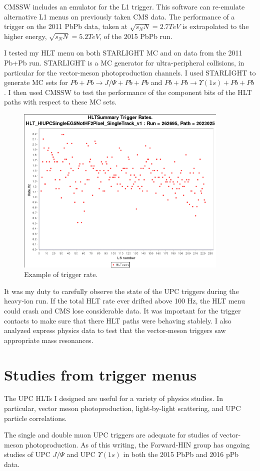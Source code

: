 CMSSW includes an emulator for the L1 trigger. This software can re-emulate alternative L1 menus on previously taken CMS data. The performance of a trigger on the 2011 PbPb data, taken at $\sqrt{s_NN} = 2.7 TeV$ is extrapolated to the higher energy, $\sqrt{s_NN} = 5.2 TeV$, of the 2015 PbPb run.

I tested my HLT menu on both STARLIGHT MC and on data from the 2011 Pb+Pb run. STARLIGHT is a MC generator for ultra-peripheral collisions, in particular for the vector-meson photoproduction channels. I used STARLIGHT to generate MC sets for $Pb+Pb\rightarrow J/\Psi+Pb+Pb$ and $Pb+Pb\rightarrow \Upsilon(1s)+Pb+Pb$. I then used CMSSW to test the performance of the component bits of the HLT paths with respect to these MC sets. 

\begin{figure}[h!]
\begin{centering}
\includegraphics[width=4in]{Chapter5/importfigs/triggerRateExample.png}
\par\end{centering}
\caption{Example of trigger rate. \label{fig:trigRate}}
\end{figure}

It was my duty to carefully observe the state of the UPC triggers during the heavy-ion run. If the total HLT rate ever drifted above 100 Hz, the HLT menu could crash and CMS lose considerable data. It was important for the trigger contacts to make sure that there HLT paths were behaving stablely. I also analyzed express physics data to test that the vector-meson triggers saw appropriate mass resonances.


\section{Studies from trigger menus}

The UPC HLTs I designed are useful for a variety of physics studies. In particular, vector meson photoproduction, light-by-light scattering, and UPC particle correlations. 

The single and double muon UPC triggers are adequate for studies of vector-meson photoproduction. As of this writing, the Forward-HIN group has ongoing studies of UPC $J/\Psi$ and UPC $\Upsilon(1s)$ in both the 2015 PbPb and 2016 pPb data. 